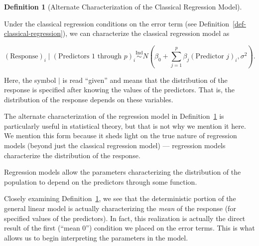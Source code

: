 \documentclass[
  letterpaper,
  DIV=11,
  numbers=noendperiod]{scrreprt}
\theoremstyle{definition}
\newtheorem{definition}{Definition}[chapter]
\theoremstyle{definition}
\theoremstyle{remark}
\begin{document}
\begin{definition}[Alternate Characterization of the Classical
Regression
Model]\protect\hypertarget{def-alternate-characterization}{}\label{def-alternate-characterization}

Under the classical regression conditions on the error term (see
Definition~\ref{def-classical-regression}), we can characterize the
classical regression model as

\[(\text{Response})_i \mid (\text{Predictors 1 through } p)_i \stackrel{\text{Ind}}{\sim} N\left(\beta_0 + \sum\limits_{j=1}^{p} \beta_j (\text{Predictor } j)_i, \sigma^2\right).\]

Here, the symbol \(\mid\) is read ``given'' and means that the
distribution of the response is specified after knowing the values of
the predictors. That is, the distribution of the response depends on
these variables.

\end{definition}

The alternate characterization of the regression model in
Definition~\ref{def-alternate-characterization} is particularly useful
in statistical theory, but that is not why we mention it here. We
mention this form because it sheds light on the true nature of
regression models (beyond just the classical regression model) ---
regression models characterize the distribution of the response.

\begin{tcolorbox}[enhanced jigsaw, left=2mm, toprule=.15mm, arc=.35mm, breakable, opacitybacktitle=0.6, opacityback=0, rightrule=.15mm, colbacktitle=quarto-callout-tip-color!10!white, coltitle=black, leftrule=.75mm, toptitle=1mm, colframe=quarto-callout-tip-color-frame, titlerule=0mm, title=\textcolor{quarto-callout-tip-color}{\faLightbulb}\hspace{0.5em}{Big Idea}, bottomrule=.15mm, colback=white, bottomtitle=1mm]

Regression models allow the parameters characterizing the distribution
of the population to depend on the predictors through some function.

\end{tcolorbox}

Closely examining Definition~\ref{def-alternate-characterization}, we
see that the deterministic portion of the general linear model is
actually characterizing the \emph{mean} of the response (for specified
values of the predictors). In fact, this realization is actually the
direct result of the first (``mean 0'') condition we placed on the error
terms. This is what allows us to begin interpreting the parameters in
the model.
\end{document}
